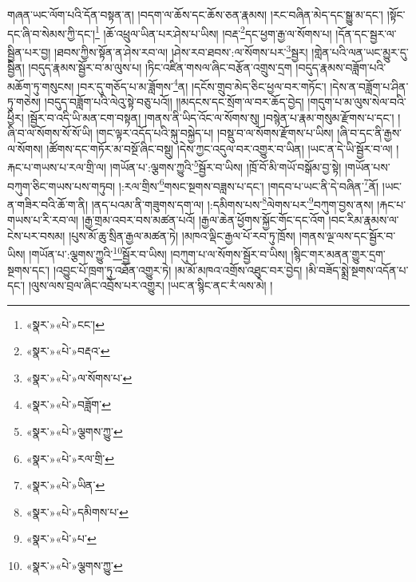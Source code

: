 གཞན་ཡང་ལོག་པའི་དོན་བསྟན་ན། །བདག་ལ་ཆོས་དང་ཆོས་ཅན་རྣམས། །རང་བཞིན་མེད་དང་སྒྱུ་མ་དང་། །སྟོང་དང་ཞི་བ་སེམས་ཀྱི་དང་།\footnote{«སྣར་»«པེ་»ངང་།} །ཆོ་འཕྲུལ་ཡིན་པར་ཤེས་པ་ཡིས། །བརྡ་\footnote{«སྣར་»«པེ་»བརྡའ་}དང་ཕྱག་རྒྱ་ལ་སོགས་པ། །དོན་དང་སྦྱར་ལ་སྦྱིན་པར་བྱ། །ཐབས་ཀྱིས་སྟོན་ན་ཤེས་རབ་ལ། །ཤེས་རབ་ཐབས་:ལ་སོགས་པར་\footnote{«སྣར་»«པེ་»ལ་སོགས་པ་}སྦྱར། །གླེན་པའི་ལན་ཡང་མྱུར་དུ་སྦྱིན། །བདུད་རྣམས་སྦྱོར་བ་མ་ལུས་པ། །ཏིང་འཛིན་གསལ་ཞིང་བརྩོན་འགྲུས་དྲག །བདུད་རྣམས་བཟློག་པའི་མཆོག་ཏུ་གསུངས། །བར་དུ་གཅོད་པ་མ་ཟློགས་\footnote{«སྣར་»«པེ་»བཟློག་}ན། །དངོས་གྲུབ་མེད་ཅིང་ཕྱལ་བར་གཏོང་། །དེས་ན་བཟློག་པ་ཤིན་ཏུ་གཅེས། །བདུད་བཟློག་པའི་ལེའུ་སྟེ་བཅུ་པའོ།། །།མདངས་དང་སྲོག་ལ་བར་ཆོད་བྱེད། །གདུག་པ་མ་ལུས་སེལ་བའི་ཕྱིར། །སྦྱོར་བ་འདི་ཡི་མན་ངག་བསྟན། །གནས་ནི་ཡིད་འོང་ལ་སོགས་སུ། །བསྙེན་པ་རྣམ་གསུམ་རྫོགས་པ་དང་། །ཞི་བ་ལ་སོགས་སོ་སོ་ཡི། །གང་ལྟར་འདོད་པའི་སྐུ་བསྐྱེད་པ། །བསྡུ་བ་ལ་སོགས་རྫོགས་པ་ཡིས། །ཞི་བ་དང་ནི་རྒྱས་ལ་སོགས། །ཚོགས་དང་གཏོར་མ་བསྔོ་ཞིང་བསྡུ། །དེས་ཀྱང་འདུལ་བར་འགྱུར་བ་ཡིན། །ཡང་ན་དེ་ཡི་སྦྱོར་བ་ལ། །རྐང་པ་གཡས་པ་རལ་གྲི་ལ། །གཡོན་པ་:ལྕགས་ཀྱུའི་\footnote{«སྣར་»«པེ་»ལྕགས་ཀྱུ་}སྦྱོར་བ་ཡིས། །ཁྲོ་བོ་མི་གཡོ་བསྒོམ་བྱ་སྟེ། །གཡོན་པས་བཀུག་ཅིང་གཡས་པས་གཏུབ། །:རལ་གྲིས་\footnote{«སྣར་»«པེ་»རལ་གྲི་}གསང་སྔགས་བཟླས་པ་དང་། །གདབ་པ་ཡང་ནི་དེ་བཞིན་\footnote{«སྣར་»«པེ་»ཡིན་}ནོ། །ཡང་ན་གཟིར་བའི་ཆོ་ག་ནི། །ནད་པའམ་ནི་གཟུགས་དག་ལ། །:དམིགས་པས་\footnote{«སྣར་»«པེ་»དམིགས་པ་}ལེགས་པར་\footnote{«སྣར་»«པེ་»པ་}བཀུག་བྱས་ནས། །རྐང་པ་གཡས་པ་རི་རབ་ལ། །རྒྱ་གྲམ་འབར་བས་མཚན་པའོ། །རྒྱལ་ཆེན་ཕྱོགས་སྐྱོང་གོང་དང་འོག །བང་རིམ་རྣམས་ལ་ངེས་པར་བསམ། །པུས་མོ་ཆུ་སྲིན་རྒྱལ་མཚན་ཏེ། །མཁའ་ལྡིང་རྒྱལ་པོ་རབ་ཏུ་ཁྲོས། །གནས་ལྔ་ལས་དང་སྦྱོར་བ་ཡིས། །གཡོན་པ་:ལྕགས་ཀྱུའི་\footnote{«སྣར་»«པེ་»ལྕགས་ཀྱུ་}སྦྱོར་བ་ཡིས། །བཀུག་པ་ལ་སོགས་སྦྱོར་བ་ཡིས། །སྙིང་གར་མནན་གྱུར་དྲག་སྔགས་དང་། །འབྱུང་པོ་ཁྲག་ཏུ་འཐོན་འགྱུར་ཏེ། །མ་མོ་མཁའ་འགྲོས་འཐུང་བར་བྱེད། །མི་བཟོད་སྨྲེ་སྔགས་འདོན་པ་དང་། །ལུས་ལས་བྲལ་ཞིང་འབྲོས་པར་འགྱུར། །ཡང་ན་སྙིང་ནང་རཾ་ལས་མེ། །
